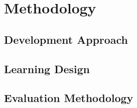 \chapter{Methodology}

\section{Development Approach}

\section{Learning Design}

\section{Evaluation Methodology}
